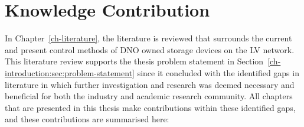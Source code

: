 \section{Knowledge Contribution}
\label{ch-conclusion:knowledge-contribution}

In Chapter~\ref{ch-literature}, the literature is reviewed that surrounds the current and present control methods of DNO owned storage devices on the LV network.
This literature review supports the thesis problem statement in Section~\ref{ch-introduction:sec:problem-statement} since it concluded with the identified gaps in literature in which further investigation and research was deemed necessary and beneficial for both the industry and academic research community.
All chapters that are presented in this thesis make contributions within these identified gaps, and these contributions are summarised here:

